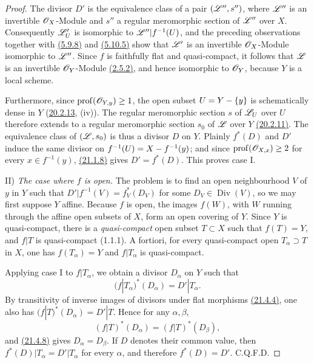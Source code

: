 \begin{proof}
The divisor $D'$ is the equivalence class of a pair
$(\mathscr{L}'',s'')$, where $\mathscr{L}''$ is an invertible $\mathscr{O}_X$-Module
and $s''$ a regular meromorphic section of $\mathscr{L}''$ over $X$.
Consequently $\mathscr{L}'_U$ is isomorphic to
$\mathscr{L}''|f^{-1}(U)$, and the preceding observations together with
{\hyperref[IV.5.9.8]{(5.9.8)}} and {\hyperref[IV.5.10.5]{(5.10.5)}} show that $\mathscr{L}'$ is an invertible
$\mathscr{O}_X$-Module isomorphic to $\mathscr{L}''$.  Since $f$ is faithfully
flat and quasi-compact, it follows that $\mathscr{L}$ is an invertible
$\mathscr{O}_Y$-Module {\hyperref[IV.2.5.2]{(2.5.2)}}, and hence isomorphic to $\mathscr{O}_Y$, because
$Y$ is a local scheme.

Furthermore, since $\operatorname{prof}(\mathscr{O}_{Y,y})\geq 1$, the open
subset $U=Y-\{y\}$ is schematically dense in $Y$
({\hyperref[IV.20.2.13]{20.2.13}}, (iv)).  The regular meromorphic section $s$ of $\mathscr{L}_U$
over $U$ therefore extends to a regular meromorphic section $s_0$ of
$\mathscr{L}$ over $Y$ {\hyperref[IV.20.2.11]{(20.2.11)}}.  The equivalence class of
$(\mathscr{L},s_0)$ is thus a divisor $D$ on $Y$.  Plainly $f^*(D)$ and
$D'$ induce the same divisor on
$f^{-1}(U)=X- f^{-1}(y)$; and since
$\operatorname{prof}(\mathscr{O}_{X,x})\geq 2$ for every
$x\in f^{-1}(y)$, {\hyperref[IV.21.1.8]{(21.1.8)}} gives $D'=f^*(D)$.  This proves case I.

\textup{II)} \emph{The case where $f$ is open.}
The problem is to find an open neighbourhood $V$ of $y$ in $Y$ such
that $D'|f^{-1}(V)=f_V^*(D_V)$ for some
$D_V\in\operatorname{Div}(V)$, so we may first suppose $Y$ affine.
Because $f$ is open, the images $f(W)$, with $W$ running through the
affine open subsets of $X$, form an open covering of $Y$.  Since $Y$
is quasi-compact, there is a \emph{quasi-compact} open subset $T\subset X$
such that $f(T)=Y$, and $f|T$ is quasi-compact (1.1.1).  A fortiori,
for every quasi-compact open $T_\alpha\supset T$ in $X$,
one has
$f(T_\alpha)=Y$ and $f|T_\alpha$ is quasi-compact.

Applying case I to $f|T_\alpha$, we obtain a divisor $D_\alpha$ on
$Y$ such that
\[
 (f|T_\alpha)^*(D_\alpha)=D'|T_\alpha.
\]
By transitivity of inverse images of divisors under flat morphisms
{\hyperref[IV.21.4.4]{(21.4.4)}}, one also has
$(f|T)^*(D_\alpha)=D'|T$.  Hence for any $\alpha,\beta$,
\[
 (f|T)^*(D_\alpha)=(f|T)^*(D_\beta),
\]
and {\hyperref[IV.21.4.8]{(21.4.8)}} gives $D_\alpha=D_\beta$.  If $D$ denotes their common
value, then $f^*(D)|T_\alpha=D'|T_\alpha$ for every $\alpha$, and
therefore $f^*(D)=D'$. C.Q.F.D.
\end{proof}

